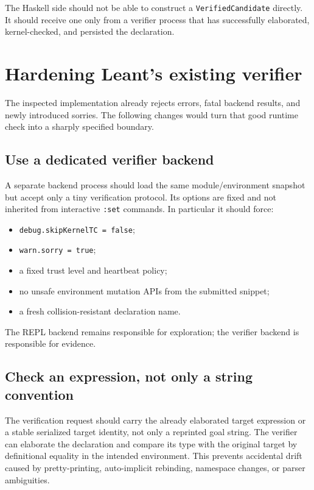 \documentclass[11pt,letterpaper,openany]{report}
\theoremstyle{definition}
\theoremstyle{remark}
\newcommand{\code}[1]{\texttt{#1}}
\begin{document}
The Haskell side should not be able to construct a \code{VerifiedCandidate} directly. It should receive one only from a verifier process that has successfully elaborated, kernel-checked, and persisted the declaration.

\section{Hardening Leant's existing verifier}
\label{sec:verifier-hardening}

The inspected implementation already rejects errors, fatal backend results, and newly introduced sorries. The following changes would turn that good runtime check into a sharply specified boundary.

\subsection{Use a dedicated verifier backend}

A separate backend process should load the same module/environment snapshot but accept only a tiny verification protocol. Its options are fixed and not inherited from interactive \code{:set} commands. In particular it should force:

\begin{itemize}
\item \code{debug.skipKernelTC = false};
\item \code{warn.sorry = true};
\item a fixed trust level and heartbeat policy;
\item no unsafe environment mutation APIs from the submitted snippet;
\item a fresh collision-resistant declaration name.
\end{itemize}

The REPL backend remains responsible for exploration; the verifier backend is responsible for evidence.

\subsection{Check an expression, not only a string convention}

The verification request should carry the already elaborated target expression or a stable serialized target identity, not only a reprinted goal string. The verifier can elaborate the declaration and compare its type with the original target by definitional equality in the intended environment. This prevents accidental drift caused by pretty-printing, auto-implicit rebinding, namespace changes, or parser ambiguities.
\end{document}
